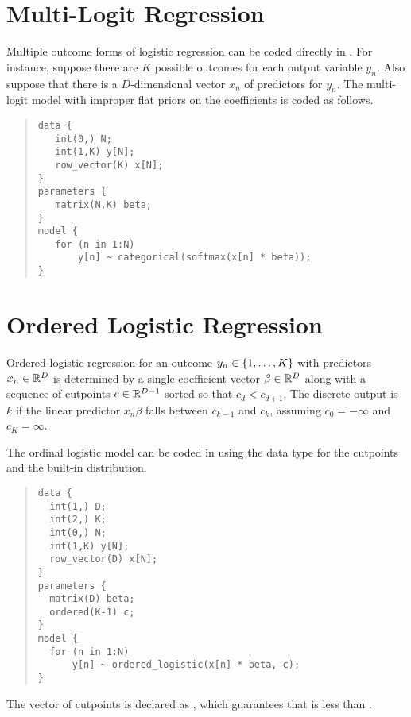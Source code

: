 \section{Multi-Logit Regression}

Multiple outcome forms of logistic regression can be coded directly in
\Stan.  For instance, suppose there are $K$ possible outcomes for each
output variable $y_n$.  Also suppose that there is a $D$-dimensional
vector $x_n$ of predictors for $y_n$.  The multi-logit model with
improper flat priors on the coefficients is coded as follows.
%
\begin{quote}
\begin{Verbatim}
data {
   int(0,) N;
   int(1,K) y[N];
   row_vector(K) x[N];
}
parameters {
   matrix(N,K) beta;
}
model {
   for (n in 1:N)
       y[n] ~ categorical(softmax(x[n] * beta));
}
\end{Verbatim}
\end{quote}
%

\section{Ordered Logistic Regression}\label{ordered-logistic.section}

Ordered logistic regression for an outcome $y_n \in
\{ 1,\ldots,K \}$ with predictors $x_n \in \mathbb{R}^D$ is determined
by a single coefficient vector $\beta \in \mathbb{R}^D$ along with a
sequence of cutpoints $c \in \mathbb{R}^{D-1}$ sorted so that $c_d <
c_{d+1}$.  The discrete output is $k$ if the linear predictor $x_n
\beta$ falls between $c_{k-1}$ and $c_k$, assuming $c_0 = -\infty$ and
$c_K = \infty$.

The ordinal logistic model can be coded in \Stan using the
 data type for the cutpoints and the built-in
 distribution.
%
\begin{quote}
\begin{Verbatim} 
data {
  int(1,) D;
  int(2,) K;
  int(0,) N;
  int(1,K) y[N];
  row_vector(D) x[N];
} 
parameters {
  matrix(D) beta;
  ordered(K-1) c;
} 
model {
  for (n in 1:N)
      y[n] ~ ordered_logistic(x[n] * beta, c);
}
\end{Verbatim}
\end{quote}
% 
The vector of cutpoints  is declared as ,
which guarantees that  is less than .

